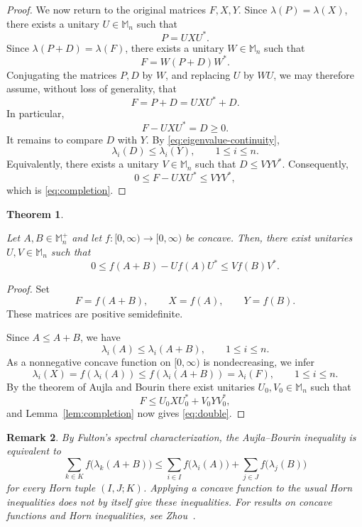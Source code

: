 \documentclass[11pt]{amsart}
\numberwithin{equation}{section}
\newtheorem{theorem}{Theorem}[section]
\newtheorem{remark}[theorem]{Remark}
\newcommand{\Mn}{\mathbb M_n}
\newcommand{\Mnp}{\mathbb M_n^+}
\begin{document}
\begin{proof}
We now return to the original matrices \(F,X,Y\). Since
\(\lambda(P)=\lambda(X)\), there exists a unitary \(U\in\Mn\) such that
\[
    P=UXU^*.
\]
Since \(\lambda(P+D)=\lambda(F)\), there exists a unitary
\(W\in\Mn\) such that
\[
    F=W(P+D)W^*.
\]
Conjugating the matrices \(P,D\) by \(W\), and replacing \(U\) by
\(WU\), we may therefore assume, without loss of generality, that
\[
    F=P+D=UXU^*+D.
\]
In particular,
\[
    F-UXU^*=D\geq0.
\]
It remains to compare \(D\) with \(Y\). By \eqref{eq:eigenvalue-continuity},
\[
    \lambda_i(D)\leq\lambda_i(Y),
    \qquad 1\leq i\leq n.
\]
Equivalently, there exists a unitary \(V\in\Mn\) such that
\(
    D\leq VYV^*.
\)
Consequently,
\[
    0\leq F-UXU^*\leq VYV^*,
\]
which is \eqref{eq:completion}.
\end{proof}


\begin{theorem}\label{thm:double}

Let \(A,B\in\Mnp\) and let
\(f:[0,\infty)\to[0,\infty)\) be concave. Then, there exist unitaries
\(U,V\in\Mn\) such that
\begin{equation}\label{eq:double}
    0\leq f(A+B)-Uf(A)U^*
    \leq Vf(B)V^*.
\end{equation}
\end{theorem}

\begin{proof}
Set
\[
    F=f(A+B),\qquad
    X=f(A),\qquad
    Y=f(B).
\]
These matrices are positive semidefinite.

Since \(A\leq A+B\), we have
\[
    \lambda_i(A)\leq\lambda_i(A+B),
    \qquad 1\leq i\leq n.
\]
As a nonnegative concave function on \([0,\infty)\) is
nondecreasing, we infer
\[
    \lambda_i(X)
    =f(\lambda_i(A))
    \leq f(\lambda_i(A+B))
    =\lambda_i(F),
    \qquad 1\leq i\leq n.
\]
By the theorem of Aujla and Bourin
there exist unitaries
\(U_0,V_0\in\Mn\) such that
\[
    F\leq U_0 X U_0^*+V_0 Y V_0^*,
\]
and Lemma~\ref{lem:completion} now gives
\eqref{eq:double}.
\end{proof}

\begin{remark}
\label{rem:functional-horn}
By Fulton's spectral characterization, the Aujla--Bourin
inequality is equivalent to
\[
\sum_{k\in K} f\bigl(\lambda_k(A+B)\bigr)
\leq
\sum_{i\in I} f\bigl(\lambda_i(A)\bigr)
+
\sum_{j\in J} f\bigl(\lambda_j(B)\bigr)
\]
for every Horn tuple $(I,J;K)$.
Applying a concave function to the usual Horn inequalities does
not by itself give these inequalities. For results on concave
functions and Horn inequalities, see Zhou~\cite{JZhou26}.
\end{remark}
\end{document}
